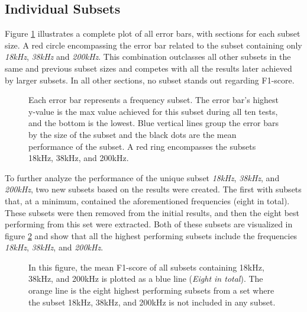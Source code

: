     \subsection{Individual Subsets}
        Figure \ref{errorbar_fig} illustrates a complete plot of all error bars, with sections for each subset size. A red circle encompassing the error bar related to the subset containing only \textit{18kHz}, \textit{38kHz} and \textit{200kHz}. This combination outclasses all other subsets in the same and previous subset sizes and competes with all the results later achieved by larger subsets. In all other sections, no subset stands out regarding F1-score.
        \clearpage
        \begin{figure}[H]
            \centering
                        
            \caption[Error bars per combination]{Each error bar represents a frequency subset. The error bar's highest y-value is the max value achieved for this subset during all ten tests, and the bottom is the lowest. Blue vertical lines group the error bars by the size of the subset and the black dots are the mean performance of the subset. A red ring encompasses the subsets 18kHz, 38kHz, and 200kHz.}
          	\medskip 
            \label{errorbar_fig}
        \end{figure}
    
        To further analyze the performance of the unique subset \textit{18kHz}, \textit{38kHz}, and \textit{200kHz}, two new subsets based on the results were created. The first with subsets that, at a minimum, contained the aforementioned frequencies (eight in total). These subsets were then removed from the initial results, and then the eight best performing from this set were extracted. Both of these subsets are visualized in figure \ref{with_without_figure} and show that all the highest performing subsets include the frequencies \textit{18kHz}, \textit{38kHz}, and \textit{200kHz}.
        
        \begin{figure}[H]
            \centering
            
            \caption[With and without unique subset]{In this figure, the mean F1-score of all subsets containing 18kHz, 38kHz, and 200kHz is plotted as a blue line (\textit{Eight in total}). The orange line is the eight highest performing subsets from a set where the subset 18kHz, 38kHz, and 200kHz is not included in any subset.}
          	\medskip 
            \label{with_without_figure}
        \end{figure}
        
